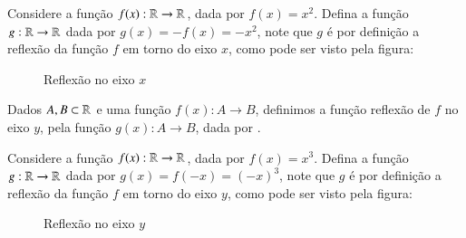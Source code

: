  \begin{exem}
  Considere a função $f(x): \mathbb{R} \to \mathbb{R}$, dada por $f(x)= x^2$. Defina a função $g: \mathbb{R} \to \mathbb{R}$ dada por $g(x)=-f(x)= -x^2$, note que $g$ é por definição a reflexão da função $f$ em torno do eixo $x$, como pode ser visto pela figura:

\begin{figure}[H]
   \centering
   \caption{Reflexão no eixo $x$}
  \end{figure}

 \end{exem}


 Dados $A, B \subset \mathbb{R}$ e uma função $f(x): A \to B$, definimos a função reflexão de $f$ no eixo $y$, pela função $g(x): A \to B$, dada por .

 \begin{exem}
  Considere a função $f(x): \mathbb{R} \to \mathbb{R}$, dada por $f(x)= x^3$. Defina a função $g: \mathbb{R} \to \mathbb{R}$ dada por $g(x)=f(-x)= (-x)^3$, note que $g$ é por definição a reflexão da função $f$ em torno do eixo $y$, como pode ser visto pela figura:

\begin{figure}[H]
   \centering
   \caption{Reflexão no eixo $y$}
  \end{figure}

 \end{exem}

